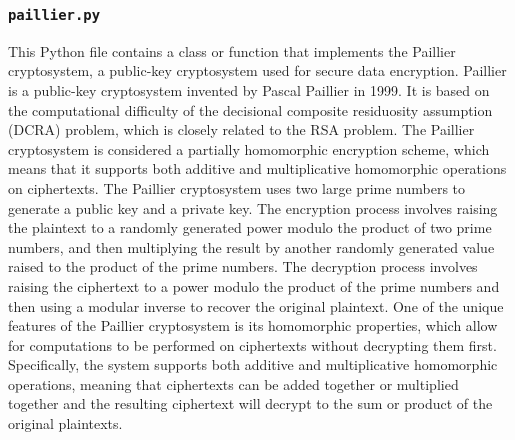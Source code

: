 \documentclass{article}
\begin{document}
\subsubsection{\texttt{paillier.py}} This Python file contains a class or function that implements the Paillier cryptosystem, a public-key cryptosystem used for secure data encryption.
Paillier is a public-key cryptosystem invented by Pascal Paillier in 1999.
It is based on the computational difficulty of the decisional composite residuosity assumption (DCRA) problem, which is closely related to the RSA problem.
The Paillier cryptosystem is considered a partially homomorphic encryption scheme, which means that it supports both additive and multiplicative homomorphic operations on ciphertexts.
The Paillier cryptosystem uses two large prime numbers to generate a public key and a private key.
The encryption process involves raising the plaintext to a randomly generated power modulo the product of two prime numbers, and then multiplying the result by another randomly generated value raised to the product of the prime numbers. The decryption process involves raising the ciphertext to a power modulo the product of the prime numbers and then using a modular inverse to recover the original plaintext.
One of the unique features of the Paillier cryptosystem is its homomorphic properties, which allow for computations to be performed on ciphertexts without decrypting them first.
Specifically, the system supports both additive and multiplicative homomorphic operations, meaning that ciphertexts can be added together or multiplied together and the resulting ciphertext will decrypt to the sum or product of the original plaintexts.
\end{document}
